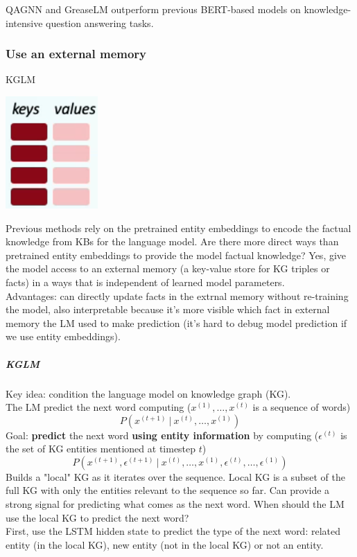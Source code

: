 \documentclass[10pt]{report}
\begin{document}
QAGNN and GreaseLM outperform previous BERT-based models on knowledge-intensive question answering tasks.
\subsubsection{Use an external memory} KGLM
\begin{center}
	\includegraphics[scale=0.5]{107.png}
\end{center}
Previous methods rely on the pretrained entity embeddings to encode the factual knowledge from KBs for the language model. Are there more direct ways than pretrained entity embeddings to provide the model factual knowledge? Yes, give the model access to an external memory (a key-value store for KG triples or facts) in a ways that is independent of learned model parameters.\\
Advantages: can directly update facts in the extrnal memory without re-training the model, also interpretable because it's more visible which fact in external memory the LM used to make prediction (it's hard to debug model prediction if we use entity embeddings).
\subparagraph{KGLM} Key idea: condition the language model on knowledge graph (KG).\\
The LM predict the next word computing ($x^{(1)},\ldots,x^{(t)}$ is a sequence of words)
$$P(x^{(t+1)}\:|\:x^{(t)},\ldots,x^{(1)})$$
Goal: \textbf{predict} the next word \textbf{using entity information} by computing ($\epsilon^{(t)}$ is the set of KG entities mentioned at timestep $t$)
$$P(x^{(t+1)},\epsilon^{(t+1)}\:|\:x^{(t)},\ldots,x^{(1)},\epsilon^{(t)},\ldots,\epsilon^{(1)})$$
Builds a "local" KG as it iterates over the sequence. Local KG is a subset of the full KG with only the entities relevant to the sequence so far. Can provide a strong signal for predicting what comes as the next word. When should the LM use the local KG to predict the next word?\\
First, use the LSTM hidden state to predict the type of the next word: related entity (in the local KG), new entity (not in the local KG) or not an entity.
\end{document}

